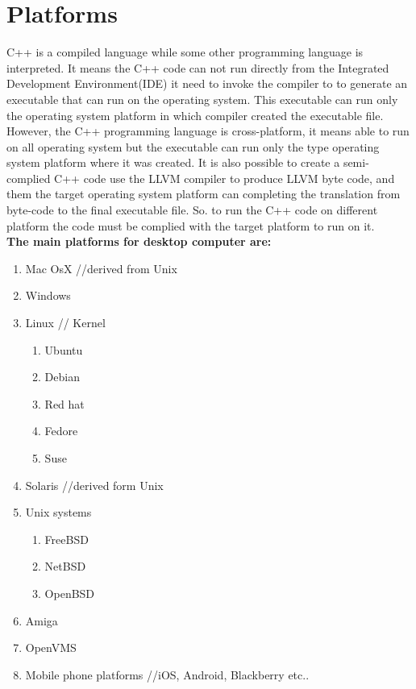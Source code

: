 \documentclass[12pt]{article}
\begin{document}
\begin{enumerate}
\begin{itemize}
	\end{itemize}
\end{enumerate}







\clearpage
\section{Platforms}
C++ is a compiled language while some other programming language is interpreted. It means the C++ code can not run directly from the Integrated Development Environment(IDE) it need to invoke the compiler to to generate an executable that can run on the operating system. This executable can run only the operating system platform in which compiler created the executable file. However, the C++ programming language is cross-platform, it means able to run on all operating system but the executable can run only the type operating system platform where it was created. It is also possible to create a semi-complied C++ code use the LLVM compiler to produce LLVM byte code, and them the target operating system platform can completing the translation from byte-code to the final executable file. So. to run the C++ code on different platform the code must be complied with the target platform to run on it. \cite{G2}\\ 

{\setlength{\parindent}{0cm} 
\textbf{The main platforms for desktop computer are:}
}
\begin{enumerate}
\item Mac OsX //derived from Unix
\item Windows
\item Linux // Kernel
	\begin{enumerate}
	\item Ubuntu
	\item Debian
	\item Red hat
	\item Fedore
	\item Suse
	\end{enumerate}
\item Solaris //derived form Unix
\item Unix systems
	\begin{enumerate}
	\item FreeBSD
	\item NetBSD
	\item OpenBSD
	\end{enumerate}
\item Amiga
\item OpenVMS
\item Mobile phone platforms //iOS, Android, Blackberry etc..
\end{enumerate}
\end{document}
